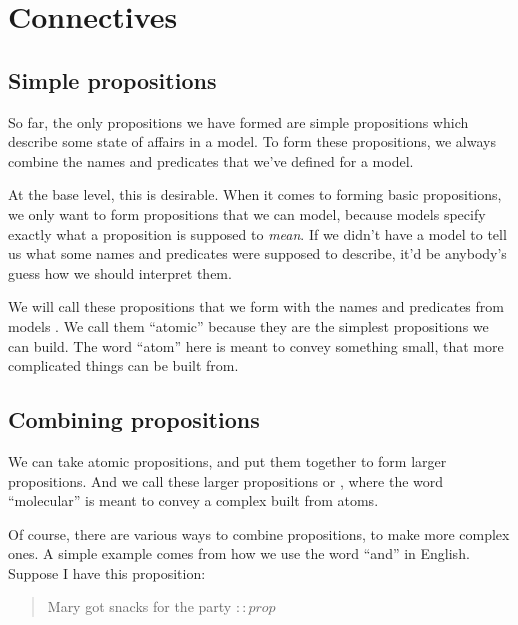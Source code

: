\documentclass[../../../main.tex]{subfiles}
\begin{document}
\chapter{Connectives}


\section{Simple propositions}

So far, the only propositions we have formed are simple propositions which describe some state of affairs in a model. To form these propositions, we always combine the names and predicates that we've defined for a model. 

At the base level, this is desirable. When it comes to forming basic propositions, we only want to form propositions that we can model, because models specify exactly what a proposition is supposed to \emph{mean}. If we didn't have a model to tell us what some names and predicates were supposed to describe, it'd be anybody's guess how we should interpret them.

We will call these propositions that we form with the names and predicates from models . We call them ``atomic'' because they are the simplest propositions we can build. The word ``atom'' here is meant to convey something small, that more complicated things can be built from.


\section{Combining propositions}

We can take atomic propositions, and put them together to form larger propositions. And we call these larger propositions  or , where the word ``molecular'' is meant to convey a complex built from atoms.

Of course, there are various ways to combine propositions, to make more complex ones. A simple example comes from how we use the word ``and'' in English. Suppose I have this proposition:

\begin{quote}
  Mary got snacks for the party $:: prop$
\end{quote}
\end{document}
